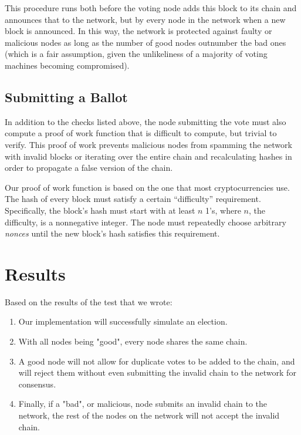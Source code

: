 \documentclass[conference]{IEEEtran}
\begin{document}
This procedure runs both before the voting node adds this block to its chain and announces that to the network, but by every node in the network when a new block is announced. In this way, the network is protected against faulty or malicious nodes as long as the number of good nodes outnumber the bad ones (which is a fair assumption, given the unlikeliness of a majority of voting machines becoming compromised).

\subsection{Submitting a Ballot}

In addition to the checks listed above, the node submitting the vote must also compute a proof of work function that is difficult to compute, but trivial to verify. This proof of work prevents malicious nodes from spamming the network with invalid blocks or iterating over the entire chain and recalculating hashes in order to propagate a false version of the chain.

Our proof of work function is based on the one that most cryptocurrencies use. The hash of every block must satisfy a certain ``difficulty'' requirement. Specifically, the block's hash must start with at least $n$ 1's, where $n$, the difficulty, is a nonnegative integer. The node must repeatedly choose arbitrary \textit{nonces} until the new block's hash satisfies this requirement.

\section{Results}

Based on the results of the test that we wrote:

\begin{enumerate}
    \item Our implementation will successfully simulate an election.
    \item With all nodes being "good", every node shares the same chain.
    \item A good node will not allow for duplicate votes to be added to the chain, and will reject them without even submitting the invalid chain to the network for consensus.
    \item Finally, if a "bad", or malicious, node submits an invalid chain to the network, the rest of the nodes on the network will not accept the invalid chain.
\end{enumerate}
\end{document}
